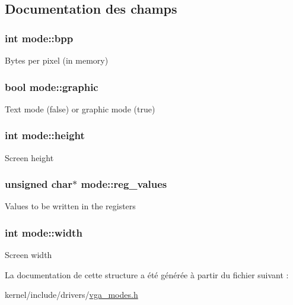 \subsection{Documentation des champs}
\hypertarget{structmode_a5ca924aaa8f33c270e7896095df93c64}{
\subsubsection[{bpp}]{\setlength{\rightskip}{0pt plus 5cm}int mode\-::bpp}}\label{structmode_a5ca924aaa8f33c270e7896095df93c64}
Bytes per pixel (in memory) \hypertarget{structmode_a04810864c94405d05fdab5f4467a4db3}{
\subsubsection[{graphic}]{\setlength{\rightskip}{0pt plus 5cm}bool mode\-::graphic}}\label{structmode_a04810864c94405d05fdab5f4467a4db3}
Text mode (false) or graphic mode (true) \hypertarget{structmode_a5e0e1e7b517ffe3532d75bda4b47b2c4}{
\subsubsection[{height}]{\setlength{\rightskip}{0pt plus 5cm}int mode\-::height}}\label{structmode_a5e0e1e7b517ffe3532d75bda4b47b2c4}
Screen height \hypertarget{structmode_a704a184dc9d562c705d1feeb5be8788b}{
\subsubsection[{reg\-\_\-values}]{\setlength{\rightskip}{0pt plus 5cm}unsigned char$\ast$ mode\-::reg\-\_\-values}}\label{structmode_a704a184dc9d562c705d1feeb5be8788b}
Values to be written in the registers \hypertarget{structmode_ae3caae9e51730e3fc85ab1f7c9bfce89}{
\subsubsection[{width}]{\setlength{\rightskip}{0pt plus 5cm}int mode\-::width}}\label{structmode_ae3caae9e51730e3fc85ab1f7c9bfce89}
Screen width 

La documentation de cette structure a été générée à partir du fichier suivant \-:\begin{DoxyCompactItemize}
\item 
kernel/include/drivers/\hyperlink{vga__modes_8h}{vga\-\_\-modes.\-h}\end{DoxyCompactItemize}
